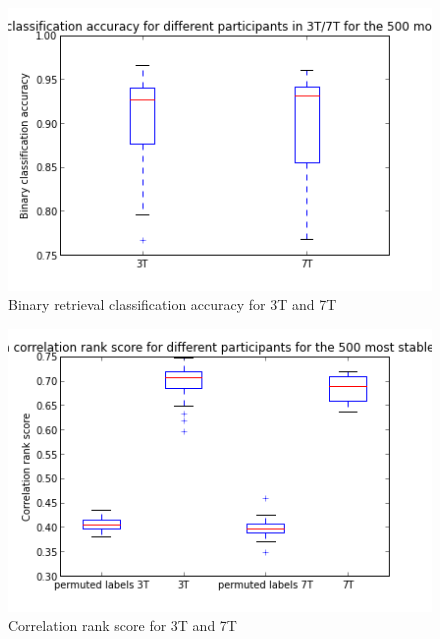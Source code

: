 \begin{figure}
	\centering
	\includegraphics[width=\linewidth]{pics/binary_retrieval_accuracy}
	\caption{Binary retrieval classification accuracy for 3T and 7T}
	\label{fig:binretr}
\end{figure}
 
 
 
 
\begin{figure}
	\centering
	\includegraphics[width=\linewidth]{pics/correlation_rank_score}
	\caption{Correlation rank score for 3T and 7T}
	\label{fig:rankscore}
\end{figure}
 
